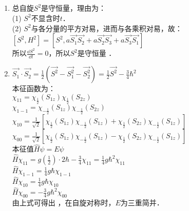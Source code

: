 \subsection{ }
\begin{enumerate}
\item 总自旋$S^2$是守恒量，理由为：\\
(1) $S^2$不显含时$t$．\\
(2) $S^2$与各分量的平方对易，进而与各乘积对易，故：\\
$[S^2 ,H^2] = [S^2 , a \vec{S_1} \vec{S_2} + a \vec{S_2} \vec{S_3} + a \vec{S_3} \vec{S_1}]$ \\
所以$\frac{\dd{S^2}}{\dd{t}}=0$，所以$S^2$是守恒量 ．

\item $\displaystyle \vec{S_1} \cdot \vec{S_2} = \frac{1}{2} (\vec{S^2} -\vec{S^2_1} -\vec{S^2_2}) = \frac{1}{2} \vec{S^2} - \frac{3}{4} \hbar^2 $ \\

本征函数为：\\

$\chi_{11} = \chi_{\frac{1}{2}}(S_{1z})\chi_{\frac{1}{2}}(S_{2z}) $ \\

$\chi_{1-1} = \chi_{-\frac{1}{2}}(S_{1z})\chi_{-\frac{1}{2}}(S_{2z}) $ \\

$\displaystyle \chi_{10} = \frac{1}{\sqrt{2}} \left[ \chi_{\frac{1}{2}}(S_{1z})\chi_{-\frac{1}{2}}(S_{1z}) + \chi_{\frac{1}{2}}(S_{2z})\chi_{-\frac{1}{2}}(S_{1z}) \right]$ \\

$\displaystyle \chi_{00} = \frac{1}{\sqrt{2}} \left[ \chi_{\frac{1}{2}}(S_{1z})\chi_{-\frac{1}{2}}(S_{1z}) - \chi_{\frac{1}{2}}(S_{2z})\chi_{-\frac{1}{2}}(S_{1z}) \right] $ \\

本征值$\hat{H}\psi = E\psi $ \\

$\displaystyle \hat{H}\chi_{11} = g(\frac{1}{2}) \cdot 2\hbar - \frac{3}{4} \chi_{11} = \frac{1}{4}g\hbar^{2} \chi_{11} $ \\
$\displaystyle \hat{H}\chi_{1-1} = \frac{1}{4}g\hbar \chi_{1-1} $ \\
$\displaystyle \hat{H}\chi_{10} = \frac{1}{4}g\hbar \chi_{10} $ \\
$\displaystyle \hat{H}\chi_{00} = -\frac{3}{4}g\hbar^{2} \chi_{00} $ \\
由上式可得出 ，在自旋对称时，$E$为三重简并．
\end{enumerate}